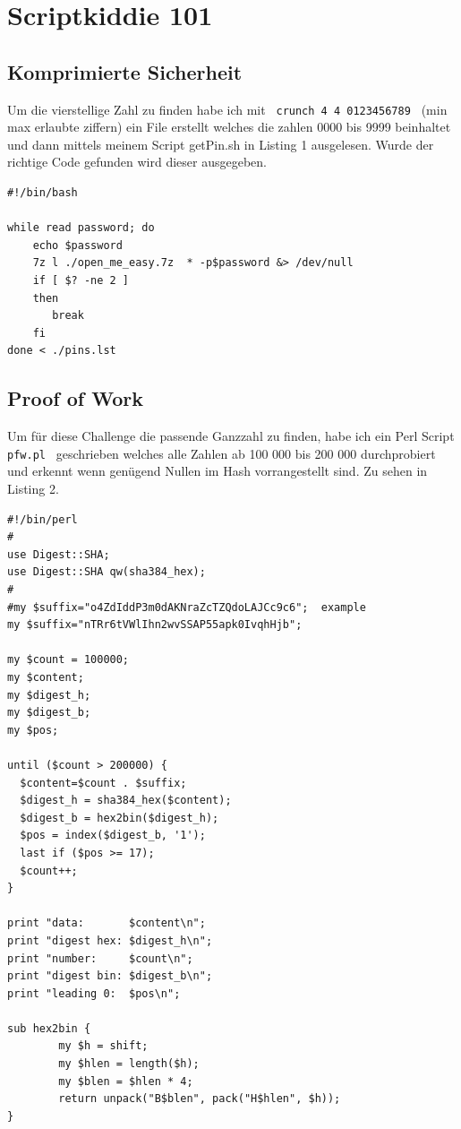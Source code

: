 \documentclass[12pt,a4paper,titlepage,oneside]{scrartcl}
\begin{document}
\section{Scriptkiddie 101}

\subsection{Komprimierte Sicherheit }
Um die vierstellige Zahl zu finden habe ich mit \lstinline{ crunch 4 4 0123456789 } (min max erlaubte ziffern) ein File erstellt welches die zahlen 0000 bis 9999 beinhaltet und dann mittels meinem Script getPin.sh in Listing 1 ausgelesen. Wurde der richtige Code gefunden wird dieser ausgegeben.

\begin{lstlisting}[caption=getPin.sh,label=code:getPin.sh,style=simple]
#!/bin/bash 

while read password; do
    echo $password
    7z l ./open_me_easy.7z  * -p$password &> /dev/null 
    if [ $? -ne 2 ]
    then
       break
    fi       
done < ./pins.lst
\end{lstlisting}

\subsection{Proof of Work}
Um für diese Challenge die passende Ganzzahl zu finden, habe ich ein Perl Script \lstinline{ pfw.pl } geschrieben welches alle Zahlen ab 100 000 bis 200 000 durchprobiert und erkennt wenn genügend Nullen im Hash vorrangestellt sind. Zu sehen in Listing 2.

\begin{lstlisting}[caption=pfw.pl,label=code:pfw.pl,style=simple]
#!/bin/perl
#
use Digest::SHA;
use Digest::SHA qw(sha384_hex);
#
#my $suffix="o4ZdIddP3m0dAKNraZcTZQdoLAJCc9c6";  example
my $suffix="nTRr6tVWlIhn2wvSSAP55apk0IvqhHjb";

my $count = 100000;
my $content;
my $digest_h;
my $digest_b;
my $pos;

until ($count > 200000) {
  $content=$count . $suffix;	
  $digest_h = sha384_hex($content);
  $digest_b = hex2bin($digest_h);
  $pos = index($digest_b, '1');
  last if ($pos >= 17);
  $count++;
}  

print "data:       $content\n";
print "digest hex: $digest_h\n";
print "number:     $count\n";
print "digest bin: $digest_b\n"; 
print "leading 0:  $pos\n";

sub hex2bin {
        my $h = shift;
        my $hlen = length($h);
        my $blen = $hlen * 4;
        return unpack("B$blen", pack("H$hlen", $h));
}
\end{lstlisting}
 
\end{document}
